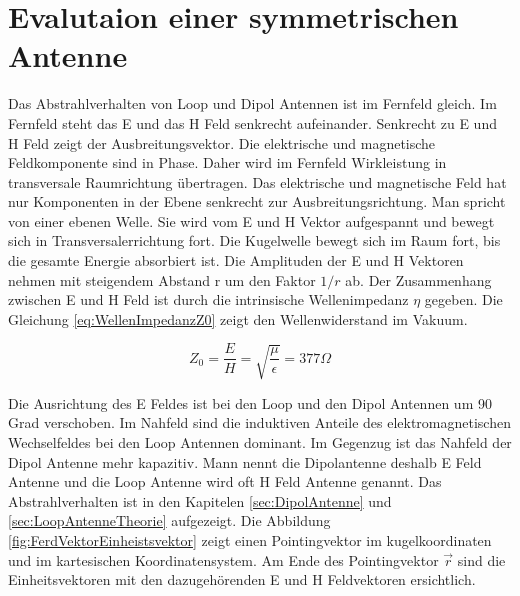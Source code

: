 \newpage
\section{Evalutaion einer symmetrischen Antenne}
Das Abstrahlverhalten von Loop und Dipol Antennen ist im Fernfeld gleich. Im Fernfeld steht das E und das
H Feld senkrecht aufeinander. Senkrecht zu E und H Feld zeigt der Ausbreitungsvektor. Die elektrische und
magnetische Feldkomponente sind in Phase. Daher wird im Fernfeld Wirkleistung in transversale Raumrichtung
übertragen. Das elektrische und magnetische Feld hat nur Komponenten in der Ebene senkrecht zur Ausbreitungsrichtung.
Man spricht von einer ebenen Welle. Sie wird vom E und H Vektor aufgespannt  und bewegt sich in
Transversalerrichtung fort. Die Kugelwelle bewegt sich im Raum fort, bis die gesamte Energie absorbiert ist. Die Amplituden der E und H Vektoren
nehmen mit steigendem Abstand r um den Faktor $1/r$  ab. Der Zusammenhang zwischen E und H Feld ist
durch die intrinsische Wellenimpedanz $\eta$ gegeben. 
Die Gleichung \ref{eq:WellenImpedanzZ0} zeigt den Wellenwiderstand im Vakuum.

\begin{equation}\label{eq:WellenImpedanzZ0}
Z_{0}=\dfrac{E}{H}=\sqrt{\dfrac{\mu}{\epsilon}}=377\Omega
\end{equation}



Die Ausrichtung des E Feldes ist bei den Loop und den Dipol Antennen um 90 Grad verschoben. 
Im Nahfeld sind die induktiven Anteile des elektromagnetischen Wechselfeldes bei den Loop Antennen dominant. 
Im Gegenzug ist das Nahfeld der Dipol Antenne mehr kapazitiv.
Mann nennt die Dipolantenne deshalb E Feld Antenne und die Loop Antenne wird oft H Feld Antenne genannt.
Das Abstrahlverhalten ist in den Kapitelen \ref{sec:DipolAntenne} und \ref{sec:LoopAntenneTheorie} aufgezeigt. Die Abbildung \ref{fig:FerdVektorEinheistsvektor} zeigt einen Pointingvektor im  kugelkoordinaten und im kartesischen Koordinatensystem. Am Ende des Pointingvektor $\vec{r}$  sind die Einheitsvektoren mit den dazugehörenden  E und H Feldvektoren ersichtlich.\\

